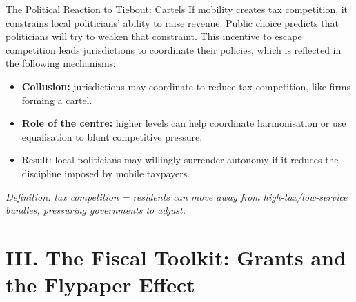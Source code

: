\documentclass[10pt]{beamer}
\begin{document}
\begin{frame}{The Political Reaction to Tiebout: Cartels}
If mobility creates tax competition, it constrains local politicians’ ability to raise revenue.
Public choice predicts that politicians will try to weaken that constraint. This incentive to escape competition leads jurisdictions to coordinate their policies, which is reflected in the following mechanisms:

\begin{itemize}
\item \textbf{Collusion:} jurisdictions may coordinate to reduce tax competition, like firms forming a cartel.
\item \textbf{Role of the centre:} higher levels can help coordinate harmonisation or use equalisation to blunt competitive pressure.
\item Result: local politicians may willingly surrender autonomy if it reduces the discipline imposed by mobile taxpayers.
\end{itemize}

\vspace{0.1cm}
\footnotesize
\textit{Definition: tax competition = residents can move away from high-tax/low-service bundles, pressuring governments to adjust.}
\end{frame}


\section{III. The Fiscal Toolkit: Grants and the Flypaper Effect}
\end{document}
